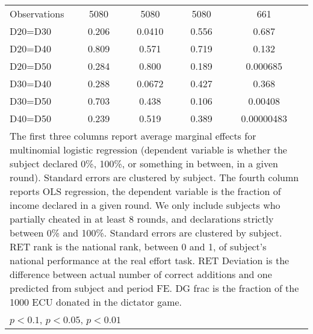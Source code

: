 \begin{tabular}{l|cccccc|cc}
\hline
Observations    &     5080         &         &     5080         &         &     5080         &         &      661         &         \\
D20=D30         &    0.206         &         &   0.0410         &         &    0.556         &         &    0.687         &         \\
D20=D40         &    0.809         &         &    0.571         &         &    0.719         &         &    0.132         &         \\
D20=D50         &    0.284         &         &    0.800         &         &    0.189         &         & 0.000685         &         \\
D30=D40         &    0.288         &         &   0.0672         &         &    0.427         &         &    0.368         &         \\
D30=D50         &    0.703         &         &    0.438         &         &    0.106         &         &  0.00408         &         \\
D40=D50         &    0.239         &         &    0.519         &         &    0.389         &         &0.00000483         &         \\
\hline\hline
\multicolumn{9}{p{16cm}}{\tiny The first three columns report average marginal effects for multinomial logistic regression (dependent variable is whether the subject declared 0\%, 100\%, or something in between, in a given round). Standard errors are clustered by subject. The fourth column reports OLS regression, the dependent variable is the fraction of income declared in a given round. We only include subjects who partially cheated in at least 8 rounds, and declarations strictly between 0\% and 100\%. Standard errors are clustered by subject. RET rank is the national rank, between 0 and 1, of subject's national performance at the real effort task. RET Deviation is the difference between actual number of correct additions and one predicted from subject and period FE. DG frac is the fraction of the 1000 ECU donated in the dictator game.}\\
\multicolumn{9}{l}{\tiny \sym{*} \(p<0.1\), \sym{**} \(p<0.05\), \sym{***} \(p<0.01\)}\\
\end{tabular}